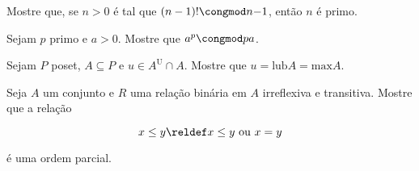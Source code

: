 \begin{exercise}
    Mostre que, se $n >0$ é tal que $(n-1)! \congmod n {-1}$, então $n$ é primo.
\end{exercise}

\begin{exercise}
    Sejam $p$ primo e $a>0$. Mostre que $a^p \congmod p a$.
\end{exercise}

\begin{exercise}
    Sejam $P$ poset, $A \subseteq P$ e $u \in A^{\mathrm{U}}\cap A$. Mostre que $u = \mathrm{lub}A = \mathrm{max}A$.  
\end{exercise}

\begin{exercise}
    Seja $A$ um conjunto e $R$ uma relação binária em $A$ irreflexiva e transitiva. Mostre que a relação

    $$x \le y \reldef x\le y \text{ ou } x=y$$

    é uma ordem parcial.
\end{exercise}